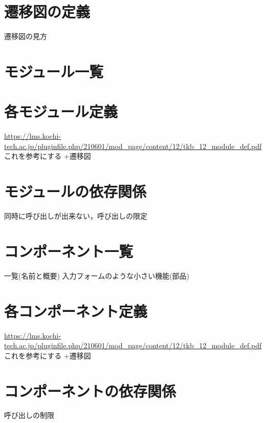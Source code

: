 \documentclass[a4paper, titlepage]{jsarticle}
\begin{document}
\section{遷移図の定義}
遷移図の見方

\section{モジュール一覧}

\section{各モジュール定義}
\url{https://lms.kochi-tech.ac.jp/pluginfile.php/210601/mod_page/content/12/tkb_12_module_def.pdf}これを参考にする
+遷移図
\section{モジュールの依存関係}
同時に呼び出しが出来ない，呼び出しの限定


\section{コンポーネント一覧}
一覧(名前と概要)
入力フォームのような小さい機能(部品)
\section{各コンポーネント定義}
\url{https://lms.kochi-tech.ac.jp/pluginfile.php/210601/mod_page/content/12/tkb_12_module_def.pdf}これを参考にする
+遷移図
\section{コンポーネントの依存関係}
呼び出しの制限


\end{document}
